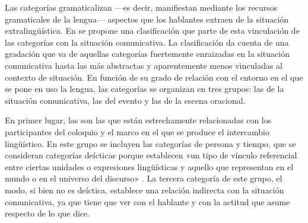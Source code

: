 Las categorías gramaticalizan ---es decir, manifiestan mediante los recursos
gramaticales de la lengua--- aspectos que los hablantes extraen de la situación
extralingüística. En \textcite{giammatteo2018} se propone una clasificación que
parte de esta vinculación de las categorías con la situación comunicativa. La
clasificación da cuenta de una gradación que va de aquellas categorías
fuertemente enraizadas en la situación comunicativa hasta las más abstractas y
aparentemente menos vinculadas al contexto de situación. En función de su grado
de relación con el entorno en el que se pone en uso la lengua, las categorías se
organizan en tres grupos: las de la situación comunicativa, las del evento y las
de la escena oracional.

En primer lugar, las  son las
que están estrechamente relacionadas con los participantes del coloquio y el
marco en el que se produce el intercambio lingüístico. En este grupo se incluyen
las categorías de persona y tiempo, que se consideran categorías deícticas
porque establecen «un tipo de vínculo referencial entre ciertas unidades o
expresiones lingüísticas y aquello que representan en el mundo o en el universo
del discurso» \parencite[932]{eguren1999}. La tercera categoría de este grupo,
el modo, si bien no es deíctica, establece una relación indirecta con la
situación comunicativa, ya que tiene que ver con el hablante y con la actitud
que asume respecto de lo que dice.

